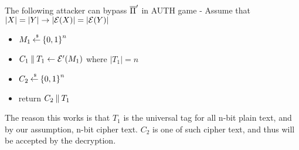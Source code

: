\documentclass[11pt]{article}
\begin{document}
The following attacker can bypass $\overline{\Pi}'$ in AUTH game - Assume that $|X|=|Y| \rightarrow |{\cal E}(X)|=|{\cal E}(Y)|$

\begin{itemize}
\item $M_1 {\:\stackrel{{\scriptscriptstyle \hspace{0.2em}\$}} {\leftarrow}\:} {\{0,1\}}^n$
\item $C_1 \:\|\: T_1 \gets {\cal E}'(M_1)$ where $|T_1|=n$
\item $C_2 {\:\stackrel{{\scriptscriptstyle \hspace{0.2em}\$}} {\leftarrow}\:} {\{0,1\}}^{n}$
\item return $C_2 \:\|\: T_1$
\end{itemize}

The reason this works is that $T_1$ is the universal tag for all n-bit plain text, and by our assumption, n-bit cipher text. $C_2$ is one of such cipher text, and thus will be accepted by the decryption.
\end{document}
